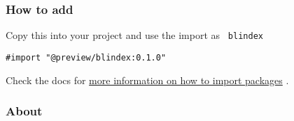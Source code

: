 \begin{Shaded}
\begin{Highlighting}[]
\KeywordTok{:}
\AttributeTok{  }\KeywordTok{:}
\AttributeTok{  }\KeywordTok{:}
\AttributeTok{  }\KeywordTok{:}
\AttributeTok{    }\KeywordTok{:}\AttributeTok{ }
\AttributeTok{    }\KeywordTok{:}\AttributeTok{ }
\AttributeTok{  }\KeywordTok{:}
\AttributeTok{  }\KeywordTok{:}\AttributeTok{ }
\AttributeTok{  }\KeywordTok{:}
\end{Highlighting}
\end{Shaded}

\subsubsection{How to add}\label{how-to-add}

Copy this into your project and use the import as \texttt{\ blindex\ }

\begin{verbatim}
#import "@preview/blindex:0.1.0"
\end{verbatim}



Check the docs for
\href{https://typst.app/docs/reference/scripting/\#packages}{more
information on how to import packages} .

\subsubsection{About}\label{about}

